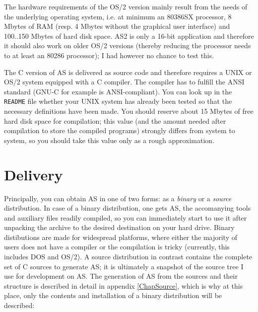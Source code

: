\documentclass[12pt,twoside]{report}
\newcommand{\tty}[1]{{\tt #1}}
\begin{document}
The hardware requirements of the OS/2  version
mainly result from the needs of the underlying operating system, i.e. at
minimum an 80386SX processor, 8 Mbytes of RAM (resp. 4 Mbytes without the
graphical user interface) and 100..150 Mbytes of hard disk space.  AS2 is
only a 16-bit application and therefore it should also work on older OS/2
versions (thereby reducing the processor needs to at least an 80286
processor); I had however no chance to test this.

The C version of AS  is delivered as source code and
therefore requires a UNIX or OS/2 system equipped with a C compiler.  The
compiler has to fulfill the ANSI standard (GNU-C for example is
ANSI-compliant).  You can look up in the \tty{README} file whether your
UNIX system has already been tested so that the necessary definitions have
been made.  You should reserve about 15 Mbytes of free hard disk space for
compilation; this value (and the amount needed after compilation to store
the compiled programs) strongly differs from system to system, so you
should take this value only as a rough approximation.


\section{Delivery}

Principally, you can obtain AS in one of two forms: as a {\em binary} or a
{\em source} distribution.  In case of a binary distribution, one gets AS,
the accomanying tools and auxiliary files readily compiled, so you can
immediately start to use it after unpacking the archive to the desired
destination on your hard drive.
Binary distibutions are made for widespread platforms, where either the
majority of users does not have a compiler or the compilation is tricky
(currently, this includes DOS and OS/2).  A source distribution in
contrast contains the complete set of C sources to generate AS; it is
ultimately a snapshot of the source tree I use for development on AS.  The
generation of AS from the sources and their structure is described in
detail in appendix \ref{ChapSource}, which is why at this place, only the
contents and installation of a binary distribution will be described:
\end{document}
